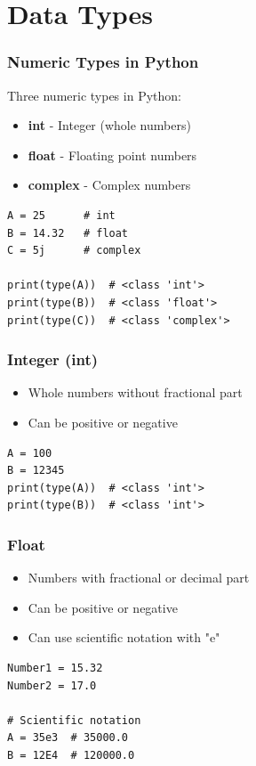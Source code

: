 \documentclass[aspectratio=169]{beamer}
\begin{document}
\section{Data Types}

\begin{frame}[fragile]
\frametitle{Numeric Types in Python}
Three numeric types in Python:
\begin{itemize}
\item \textbf{int} - Integer (whole numbers)
\item \textbf{float} - Floating point numbers
\item \textbf{complex} - Complex numbers
\end{itemize}

\begin{lstlisting}
A = 25      # int
B = 14.32   # float
C = 5j      # complex

print(type(A))  # <class 'int'>
print(type(B))  # <class 'float'>
print(type(C))  # <class 'complex'>
\end{lstlisting}
\end{frame}

\begin{frame}[fragile]
\frametitle{Integer (int)}
\begin{itemize}
\item Whole numbers without fractional part
\item Can be positive or negative
\end{itemize}

\begin{lstlisting}
A = 100
B = 12345
print(type(A))  # <class 'int'>
print(type(B))  # <class 'int'>
\end{lstlisting}
\end{frame}

\begin{frame}[fragile]
\frametitle{Float}
\begin{itemize}
\item Numbers with fractional or decimal part
\item Can be positive or negative
\item Can use scientific notation with "e"
\end{itemize}

\begin{lstlisting}
Number1 = 15.32
Number2 = 17.0

# Scientific notation
A = 35e3  # 35000.0
B = 12E4  # 120000.0
\end{lstlisting}
\end{frame}
\end{document}
